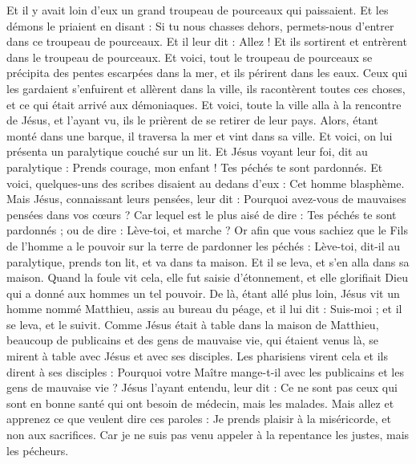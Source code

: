 \begin{multicols}{2}
Et il y avait loin d'eux un grand troupeau de pourceaux qui paissaient.
Et les démons le priaient en disant : Si tu nous chasses dehors, permets-nous d'entrer dans ce troupeau de pourceaux.
Et il leur dit : Allez ! Et ils sortirent et entrèrent dans le troupeau de pourceaux. Et voici, tout le troupeau de pourceaux se précipita des pentes escarpées dans la mer, et ils périrent dans les eaux.
Ceux qui les gardaient s'enfuirent et allèrent dans la ville, ils racontèrent toutes ces choses, et ce qui était arrivé aux démoniaques.
Et voici, toute la ville alla à la rencontre de Jésus, et l'ayant vu, ils le prièrent de se retirer de leur pays.
\VerseOne{}Alors, étant monté dans une barque, il traversa la mer et vint dans sa ville.
Et voici, on lui présenta un paralytique couché sur un lit. Et Jésus voyant leur foi, dit au paralytique : Prends courage, mon enfant ! Tes péchés te sont pardonnés.
Et voici, quelques-uns des scribes disaient au dedans d'eux : Cet homme blasphème.
Mais Jésus, connaissant leurs pensées, leur dit : Pourquoi avez-vous de mauvaises pensées dans vos cœurs ?
Car lequel est le plus aisé de dire : Tes péchés te sont pardonnés ; ou de dire : Lève-toi, et marche ?
Or afin que vous sachiez que le Fils de l'homme a le pouvoir sur la terre de pardonner les péchés : Lève-toi, dit-il au paralytique, prends ton lit, et va dans ta maison.
Et il se leva, et s'en alla dans sa maison.
Quand la foule vit cela, elle fut saisie d'étonnement, et elle glorifiait Dieu qui a donné aux hommes un tel pouvoir.
De là, étant allé plus loin, Jésus vit un homme nommé Matthieu, assis au bureau du péage, et il lui dit : Suis-moi ; et il se leva, et le suivit.
Comme Jésus était à table dans la maison de Matthieu, beaucoup de publicains et des gens de mauvaise vie, qui étaient venus là, se mirent à table avec Jésus et avec ses disciples.
Les pharisiens virent cela et ils dirent à ses disciples : Pourquoi votre Maître mange-t-il avec les publicains et les gens de mauvaise vie ?
Jésus l'ayant entendu, leur dit : Ce ne sont pas ceux qui sont en bonne santé qui ont besoin de médecin, mais les malades.
Mais allez et apprenez ce que veulent dire ces paroles : Je prends plaisir à la miséricorde, et non aux sacrifices. Car je ne suis pas venu appeler à la repentance les justes, mais les pécheurs.

\end{multicols}
